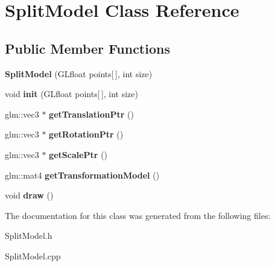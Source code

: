 \hypertarget{class_split_model}{}\section{Split\+Model Class Reference}
\label{class_split_model}
\subsection*{Public Member Functions}
\begin{DoxyCompactItemize}
\item 
\hypertarget{class_split_model_a2a29d100a2858da27db5f73236753a5a}{}\label{class_split_model_a2a29d100a2858da27db5f73236753a5a} 
{\bfseries Split\+Model} (G\+Lfloat points\mbox{[}$\,$\mbox{]}, int size)
\item 
\hypertarget{class_split_model_a08efefbd04dcfaebc4de31ea0380b844}{}\label{class_split_model_a08efefbd04dcfaebc4de31ea0380b844} 
void {\bfseries init} (G\+Lfloat points\mbox{[}$\,$\mbox{]}, int size)
\item 
\hypertarget{class_split_model_a45ba9a4c0ddd51542e34f8a47b3a2357}{}\label{class_split_model_a45ba9a4c0ddd51542e34f8a47b3a2357} 
glm\+::vec3 $\ast$ {\bfseries get\+Translation\+Ptr} ()
\item 
\hypertarget{class_split_model_aeac718718504e7b7c096e6654e30b6ae}{}\label{class_split_model_aeac718718504e7b7c096e6654e30b6ae} 
glm\+::vec3 $\ast$ {\bfseries get\+Rotation\+Ptr} ()
\item 
\hypertarget{class_split_model_a25cb815e58bb751d7d2b5b776a2c26ad}{}\label{class_split_model_a25cb815e58bb751d7d2b5b776a2c26ad} 
glm\+::vec3 $\ast$ {\bfseries get\+Scale\+Ptr} ()
\item 
\hypertarget{class_split_model_a3d7e38cbe2b1c4e308e836525829d441}{}\label{class_split_model_a3d7e38cbe2b1c4e308e836525829d441} 
glm\+::mat4 {\bfseries get\+Transformation\+Model} ()
\item 
\hypertarget{class_split_model_aa15f35cc42dc6cf106d39ff4faa404a7}{}\label{class_split_model_aa15f35cc42dc6cf106d39ff4faa404a7} 
void {\bfseries draw} ()
\end{DoxyCompactItemize}


The documentation for this class was generated from the following files\+:\begin{DoxyCompactItemize}
\item 
Split\+Model.\+h\item 
Split\+Model.\+cpp\end{DoxyCompactItemize}
